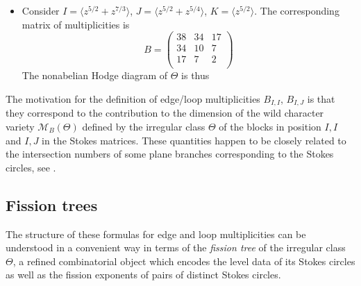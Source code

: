 \documentclass[11pt,a4paper]{amsart}
\numberwithin{equation}{section}
\newcommand{\cir}[1]{\langle #1 \rangle}
\begin{document}
\begin{example}
\begin{itemize}
\item Consider $I=\cir{z^{5/2}+z^{7/3}}$, $J=\cir{z^{5/2}+z^{5/4}}$, $K=\cir{z^{5/2}}$.
The corresponding matrix of multiplicities is 
\[
B=\begin{pmatrix}
38 & 34 & 17 \\
34 & 10 & 7 \\
17 & 7 & 2\\
\end{pmatrix}
\]
The nonabelian Hodge diagram of $\Theta$ is thus
\begin{center}
\end{center}
\end{itemize}
\end{example}

\begin{remark}
The motivation for the definition of edge/loop multiplicities $B_{I,I}$, $B_{I,J}$ is that they correspond to the contribution to the dimension of the wild character variety $\mathcal M_B(\Theta)$ defined by the irregular class $\Theta$ of the blocks in position $I,I$ and $I,J$ in the Stokes matrices. These quantities happen to be closely related to the intersection numbers of some plane branches corresponding to the Stokes circles, see \cite{hiroe2017ramified}.
\end{remark}


\subsection{Fission trees}

The structure of these formulas for edge and loop multiplicities can be understood in a convenient way in terms of the \emph{fission tree} of the irregular class $\Theta$, a refined combinatorial object which encodes the level data of its Stokes circles as well as the fission exponents of pairs of distinct Stokes circles. 
\end{document}
